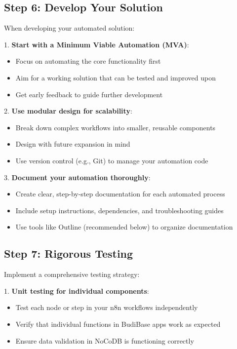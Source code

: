 \subsection{Step 6: Develop Your Solution}

When developing your automated solution:

1. \textbf{Start with a Minimum Viable Automation (MVA)}:
   \begin{itemize}
     \item Focus on automating the core functionality first
     \item Aim for a working solution that can be tested and improved upon
     \item Get early feedback to guide further development
   \end{itemize}

2. \textbf{Use modular design for scalability}:
   \begin{itemize}
     \item Break down complex workflows into smaller, reusable components
     \item Design with future expansion in mind
     \item Use version control (e.g., Git) to manage your automation code
   \end{itemize}

3. \textbf{Document your automation thoroughly}:
   \begin{itemize}
     \item Create clear, step-by-step documentation for each automated process
     \item Include setup instructions, dependencies, and troubleshooting guides
     \item Use tools like Outline (recommended below) to organize documentation
   \end{itemize}

\subsection{Step 7: Rigorous Testing}

Implement a comprehensive testing strategy:

1. \textbf{Unit testing for individual components}:
   \begin{itemize}
     \item Test each node or step in your n8n workflows independently
     \item Verify that individual functions in BudiBase apps work as expected
     \item Ensure data validation in NoCoDB is functioning correctly
   \end{itemize}

